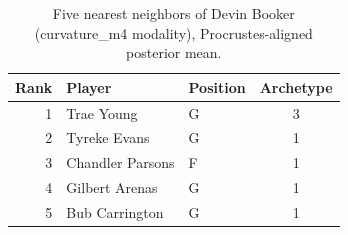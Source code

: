 \begin{table}[htbp]
  \centering\small
  \begin{tabular}{rllc}
    \toprule
    Rank & Player & Position & Archetype \\
    \midrule
    1 & Trae Young & G & 3 \\
    2 & Tyreke Evans & G & 1 \\
    3 & Chandler Parsons & F & 1 \\
    4 & Gilbert Arenas & G & 1 \\
    5 & Bub Carrington & G & 1 \\
    \bottomrule
  \end{tabular}
  \caption{Five nearest neighbors of Devin Booker (curvature_m4 modality), Procrustes-aligned posterior mean.}
  \label{tab:Devin_Booker_neighbors_curvature_m4}
\end{table}

